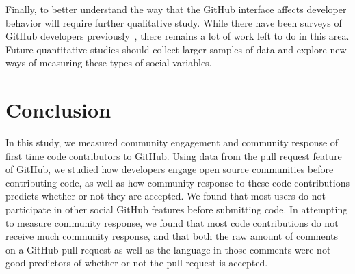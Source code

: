 \documentclass{sigchi}
\begin{document}
Finally, to better understand the way that the GitHub interface affects
developer behavior will require further qualitative study. While there have been
surveys of GitHub developers previously~\cite{mcdonald_performance_2013}, there
remains a lot of work left to do in this area. Future quantitative studies
should collect larger samples of data and explore new ways of measuring these
types of social variables.

\section{Conclusion}

In this study, we measured community engagement and community response of first
time code contributors to GitHub. Using data from the pull request feature of
GitHub, we studied how developers engage open source communities before
contributing code, as well as how community response to these code contributions
predicts whether or not they are accepted. We found that most users do not
participate in other social GitHub features before submitting code.  In
attempting to measure community response, we found that most code contributions
do not receive much community response, and that both the raw amount of comments
on a GitHub pull request as well as the language in those comments were not good
predictors of whether or not the pull request is accepted.

%
%


\end{document}
